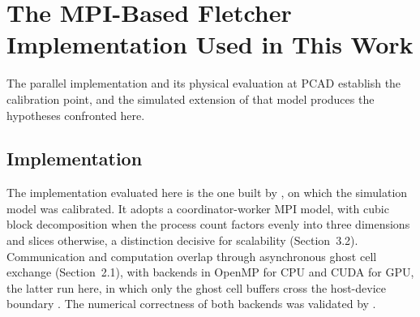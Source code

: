 \documentclass[12pt]{article}
\begin{document}
\begin{table}[tb]
  \centering
  \small
  \caption{Comparison between this work and the closest related literature.}
  \label{tab:related-work}
\end{table}

\section{The MPI-Based Fletcher Implementation Used in This Work}

The parallel implementation and its physical evaluation at PCAD establish the calibration point, and the simulated extension of that model produces the hypotheses confronted here.

\subsection{Implementation}
The implementation evaluated here is the one built by \cite{spadotto2026sbacpad}, on which the simulation model was calibrated. It adopts a coordinator-worker MPI model, with cubic block decomposition when the process count factors evenly into three dimensions and slices otherwise, a distinction decisive for scalability (Section~3.2). Communication and computation overlap through asynchronous ghost cell exchange (Section~2.1), with backends in OpenMP for CPU and CUDA for GPU, the latter run here, in which only the ghost cell buffers cross the host-device boundary \cite{micikevicius2009fd3d,pearson2020nodeaware}. The numerical correctness of both backends was validated by \cite{spadotto2026sbacpad}.
\end{document}
